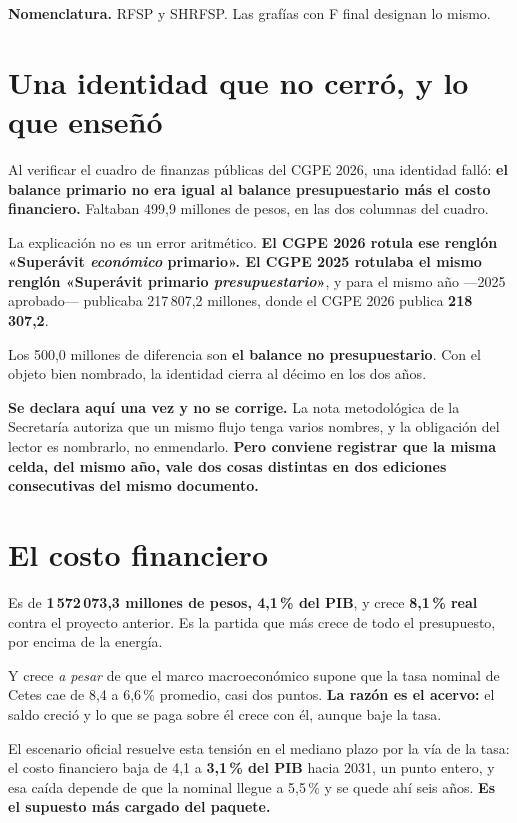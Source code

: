 \textbf{Nomenclatura.} RFSP y SHRFSP. Las grafías con F final designan lo mismo.

\section{Una identidad que no cerró, y lo que enseñó}

Al verificar el cuadro de finanzas públicas del CGPE 2026, una identidad falló:
\textbf{el balance primario no era igual al balance presupuestario más el costo financiero.}
Faltaban 499,9 millones de pesos, en las dos columnas del cuadro.

La explicación no es un error aritmético. \textbf{El CGPE 2026 rotula ese renglón «Superávit
\emph{económico} primario». El CGPE 2025 rotulaba el mismo renglón «Superávit primario
\emph{presupuestario}»}, y para el mismo año ---2025 aprobado--- publicaba 217\,807,2 millones,
donde el CGPE 2026 publica \textbf{218\,307,2}.

Los 500,0 millones de diferencia son \textbf{el balance no presupuestario}. Con el objeto bien
nombrado, la identidad cierra al décimo en los dos años.

\textbf{Se declara aquí una vez y no se corrige.} La nota metodológica de la Secretaría
autoriza que un mismo flujo tenga varios nombres, y la obligación del lector es nombrarlo, no
enmendarlo. \textbf{Pero conviene registrar que la misma celda, del mismo año, vale dos cosas
distintas en dos ediciones consecutivas del mismo documento.}




\section{El costo financiero}

Es de \textbf{1\,572\,073,3 millones de pesos, 4,1\,\% del PIB}, y crece \textbf{8,1\,\% real}
contra el proyecto anterior. Es la partida que más crece de todo el presupuesto, por encima de
la energía.

Y crece \emph{a pesar} de que el marco macroeconómico supone que la tasa nominal de Cetes cae
de 8,4 a 6,6\,\% promedio, casi dos puntos. \textbf{La razón es el acervo:} el saldo creció y
lo que se paga sobre él crece con él, aunque baje la tasa.

El escenario oficial resuelve esta tensión en el mediano plazo por la vía de la tasa: el costo
financiero baja de 4,1 a \textbf{3,1\,\% del PIB} hacia 2031, un punto entero, y esa caída
depende de que la nominal llegue a 5,5\,\% y se quede ahí seis años. \textbf{Es el supuesto
más cargado del paquete.}

